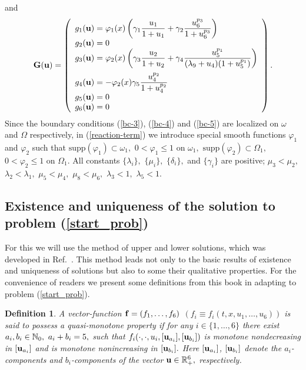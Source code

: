 \documentclass[reqno]{amsart}            %
\newtheorem{definition}{Definition}[section]
\numberwithin{equation}{section}
\begin{document}
and
\begin{equation}\label{reaction-term}
{\bf G}({\bf u}) =
\left(
\begin{array}{l}
g_1({\bf u}) = \varphi_1(x)\left(
\gamma_1 \dfrac{u_1}{1 + u_1} + \gamma_2 \dfrac{ u_6^{p_3}}{1 + u_6^{p_3}}\right)
\\%
g_2({\bf u}) = 0
\\%
g_3({\bf u}) = \varphi_2(x)\left(
\gamma_3 \dfrac{ u_2}{1 + u_2} + \gamma_4 \dfrac{ u_5^{p_1}}{(\lambda_{9} + u_4)(1 + u_5^{p_1})}\right)
\\[4mm]
g_4({\bf u}) = - \varphi_2(x) \gamma_5 \dfrac{  u_4^{p_2}}{1 + u_4^{p_2}}
\\%
g_5({\bf u}) = 0
\\%
g_6({\bf u}) = 0
\end{array}
\right).
\end{equation}
Since the boundary conditions (\ref{bc-3}), (\ref{bc-4}) and (\ref{bc-5}) are localized on $\omega$ and $\Omega$ respectively,
in (\ref{reaction-term}) we introduce special smooth functions $\varphi_1$ and $\varphi_2$ such that
$\text{supp}(\varphi_1) \subset \omega_1,$ $ 0< \varphi_1 \le 1$ on $\omega_1,$
$\text{supp}(\varphi_2) \subset \Omega_1,$ $0< \varphi_2 \le 1$ on $\Omega_1.$
All constants $\{\lambda_i\},$ $\{\mu_i\},$ $\{\delta_i\},$ and $\{\gamma_i\}$ are positive; $\mu_3 < \mu_2,$ $\lambda_2 < \lambda_1,$
$\mu_5 < \mu_4,$ $\mu_8 < \mu_6,$ $\lambda_3 < 1,$ $\lambda_5 < 1.$


\subsection{Existence and uniqueness of the solution to problem (\ref{start_prob})}\label{subs-exist}

For this we will use the method of upper and lower solutions, which was developed in Ref.~\cite{Pao}. This method leads not only to the basic results of existence and uniqueness of solutions but also to some their qualitative properties. For the convenience of readers we present some definitions from this book  in adapting to problem (\ref{start_prob}).

\begin{definition}
A vector-function ${\bf f}=(f_1,\ldots,f_6)$ $(f_i\equiv f_i(t,x,u_1,\ldots,u_6))$ is said to possess a quasi-monotone property if for any
$ i\in\{1,\ldots,6\}$ there exist $ a_i, b_i \in \Bbb N_0, \ a_i + b_i = 5,$ such that
 $f_i(\cdot,\cdot,u_i, [{\bf u}_{a_i}], [{\bf u}_{b_i}])$ is monotone nondecreasing in   $[{\bf u}_{a_i}]$ and
is monotone nonincreasing in $[{\bf u}_{b_i}].$ Here $[{\bf u}_{a_i}]$, $[{\bf u}_{b_i}]$ denote the $a_i$-components and $b_i$-components
of the vector ${\bf u} \in \Bbb R^6_+,$ respectively.
\end{definition}
\end{document}
